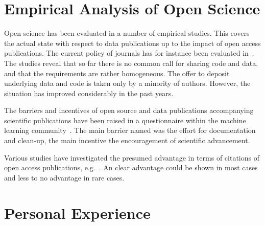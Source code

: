 \documentclass[a4paper, 10pt, twocolumn]{article}
\begin{document}
\section*{Empirical Analysis of Open Science} \label{sec:empirical_analysis}

Open science has been evaluated in a number of empirical studies. This covers the
actual state with respect to data publications up to the impact of open access 
publications. The current policy of journals has for instance been evaluated in~\cite{Stodden2013:PLOS1,Alsheikh11:PLOS}. The studies reveal that so far there is 
no common call for sharing code and data, and that the requirements are rather 
homogeneous. The offer to deposit underlying data and code is taken only by a minority
of authors. However, the situation has improved considerably in the past years.

The barriers and incentives of open source and data publications accompanying 
scientific publications have been raised in a questionnaire within the machine 
learning community~\cite{Stodden2014:talk}. The main barrier named was the effort
for documentation and clean-up, the main incentive the encouragement of scientific
advancement.

Various studies have investigated the presumed advantage in terms of citations of
open access publications, e.g.~\cite{Swan10:study,McCabe14:EI}. An clear advantage 
could be shown in most cases and less to no advantage in rare cases.


\section*{Personal Experience} \label{sec:personal_experience}
\end{document}
